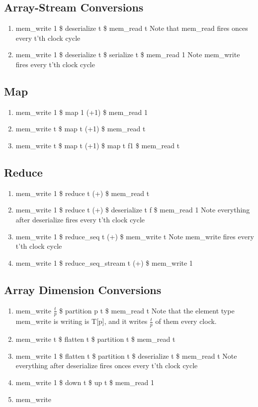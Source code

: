 \documentclass[11pt,fleqn]{article}
\numberwithin{equation}{subsection}
\begin{document}
\subsection{Array-Stream Conversions}
\begin{enumerate}
    \item mem\_write 1 \$ deserialize t \$ mem\_read t
        \subitem Note that mem\_read fires onces every t'th clock cycle
    \item mem\_write 1 \$ deserialize t \$ serialize t \$ mem\_read 1
        \subitem Note mem\_write fires every t'th clock cycle
\end{enumerate}

\subsection{Map}
\begin{enumerate}
    \item mem\_write 1 \$ map 1 (+1) \$ mem\_read 1
    \item mem\_write t \$ map t (+1) \$ mem\_read t
    \item mem\_write t \$ map t (+1) \$ map t f1 \$ mem\_read t
\end{enumerate}

\subsection{Reduce}
\begin{enumerate}
    \item mem\_write 1 \$ reduce t (+) \$ mem\_read t
    \item mem\_write 1 \$ reduce t (+) \$ deserialize t f \$ mem\_read 1 
        \subitem Note everything after deserialize fires every t'th clock cycle
    \item mem\_write 1 \$ reduce\_seq t (+) \$ mem\_write t
        \subitem Note mem\_write fires every t'th clock cycle
    \item mem\_write 1 \$ reduce\_seq\_stream t (+) \$ mem\_write 1
\end{enumerate}

\subsection{Array Dimension Conversions}
\begin{enumerate}
    \item mem\_write $\frac{t}{p}$ \$ partition p t \$ mem\_read t
        \subitem Note that the element type mem\_write is writing is T[p], 
        and it writes $\frac{t}{p}$ of them every clock.
    \item mem\_write t \$ flatten t \$ partition t \$ mem\_read t 
    \item mem\_write 1 \$ flatten t \$ partition t \$ deserialize t \$ mem\_read t
        \subitem Note everything after deserialize fires onces every t'th 
        clock cycle
    \item mem\_write 1 \$ down t \$ up t \$ mem\_read 1
    \item mem\_write 
\end{enumerate}
\end{document}
